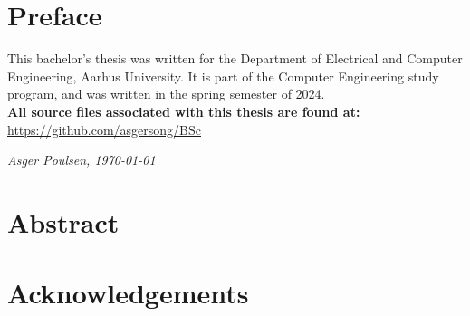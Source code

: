 \documentclass[a4paper,twoside, 12pt]{memoir} %
\begin{document}

\chapter*{Preface}
    This bachelor's thesis was written for the Department of Electrical and Computer Engineering, Aarhus University. It is part of the Computer Engineering study program, and was written in the spring semester of 2024.\\
    \textbf{All source files associated with this thesis are found at:} \url{https://github.com/asgersong/BSc}
    \vspace{1.5cm}

    \begin{flushright}
        \textit{Asger Poulsen, \today}
    \end{flushright}
\chapter*{Abstract}

\chapter*{Acknowledgements}
\tableofcontents*









\printbibliography

\appendix




\end{document}
